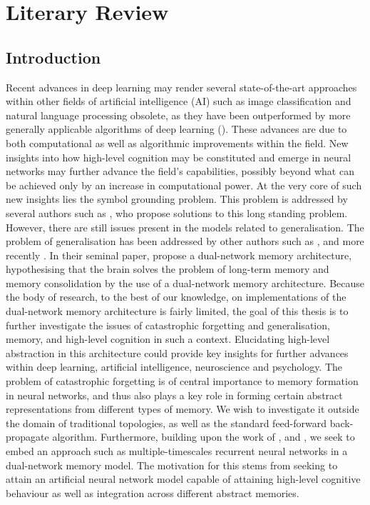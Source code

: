 
\chapter{Literary Review}
\section{Introduction}

Recent advances in deep learning may render several state-of-the-art approaches within other fields of artificial intelligence (AI) such as image classification and natural language processing obsolete, as they have been outperformed by more generally applicable algorithms of deep learning (\cite{LeCun2015, Schmidhuber2014}). These advances are due to both computational as well as algorithmic improvements within the field. New insights into how high-level cognition may be constituted and emerge in neural networks may further advance the field's capabilities, possibly beyond what can be achieved only by an increase in computational power. At the very core of such new insights lies the symbol grounding problem. This problem is addressed by several authors such as \cite{Yamashita2008, Tani2014}, who propose solutions to this long standing problem. However, there are still issues present in the models related to generalisation. The problem of generalisation has been addressed by other authors such as \cite{McClelland1995}, and more recently \cite{Hattori2014}. In their seminal paper, \cite{McClelland1995} propose a dual-network memory architecture, hypothesising that the brain solves the problem of long-term memory and memory consolidation by the use of a dual-network memory architecture. Because the body of research, to the best of our knowledge, on implementations of the dual-network memory architecture is fairly limited, the goal of this thesis is to further investigate the issues of catastrophic forgetting and generalisation, memory, and high-level cognition in such a context. Elucidating high-level abstraction in this architecture could provide key insights for further advances within deep learning, artificial intelligence, neuroscience and psychology. The problem of catastrophic forgetting is of central importance to memory formation in neural networks, and thus also plays a key role in forming certain abstract representations from different types of memory. We wish to investigate it outside the domain of traditional topologies, as well as the standard feed-forward back-propagate algorithm. Furthermore, building upon the work of \cite{Hattori2014}, and \cite{Yamashita2008}, we seek to embed an approach such as multiple-timescales recurrent neural networks in a dual-network memory model. The motivation for this stems from seeking to attain an artificial neural network model capable of attaining high-level cognitive behaviour as well as integration across different abstract memories.
